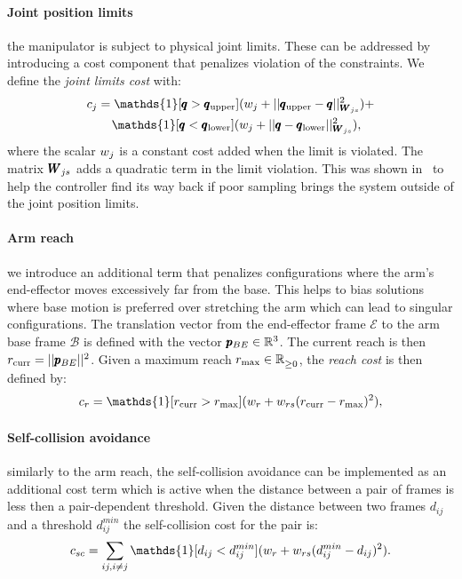  \paragraph{Joint position limits} the manipulator is subject to physical joint limits. These can be addressed by introducing a cost component that penalizes violation of the constraints. We define the \textit{joint limits cost} with:
 \begin{align}
     &c_{j} = \mathds{1}[\configRobot > \upperLimits](\weightScalar{j} + ||\upperLimits - \configRobot||^2_{\weightMatrix{js}}) + \nonumber\\ 
     &\qquad\mathds{1}[\configRobot < \lowerLimits](\weightScalar{j} +  || \configRobot - \lowerLimits||^2_{\weightMatrix{js}}), 
 \end{align}
 where the scalar $w_{j}$ is a constant cost added when the limit is violated. The matrix $\pmb{W}_{js}$ adds a quadratic term in the limit violation. This was shown in~\cite{williams_information-theoretic_2018} to help the controller find its way back if poor sampling brings the system outside of the joint position limits.
 
 \paragraph{Arm reach} we introduce an additional term that penalizes configurations where the arm's end-effector moves excessively far from the base. This helps to bias solutions where base motion is preferred over stretching the arm which can lead to singular configurations. The translation vector from the end-effector frame $\mathcal{E}$ to the arm base frame $\mathcal{B}$ is defined with the vector $\pmb{p}_{BE} \in \mathbb{R}^{3}$. The current reach is then $r_{\text{curr}} = || \pmb{p}_{BE} ||^2$. Given a maximum reach $r_{\text{max}} \in \mathbb{R}^{}_{\geq 0}$, the \textit{reach cost} is then defined by:
 \begin{equation}
   c_r = \mathds{1}[r_{\text{curr}} > r_{\text{max}}] (\weightScalar{r} + \weightScalar{rs}(r_{\text{curr}} - r_{\text{max}})^2),    
 \end{equation}

 \paragraph{Self-collision avoidance} similarly to the arm reach, the self-collision avoidance can be implemented as an additional cost term which is active when the distance between a pair of frames is less then a pair-dependent threshold. Given the distance between two frames $d_{ij}$ and a threshold $d^{min}_{ij}$ the self-collision cost for the pair is:
 \begin{equation}
   c_{sc} = \sum_{ij, i \neq j} \mathds{1}[d_{ij} < d^{min}_{ij}] (\weightScalar{r} + \weightScalar{rs}(d^{min}_{ij} - d_{ij})^2).    
 \end{equation}
 
